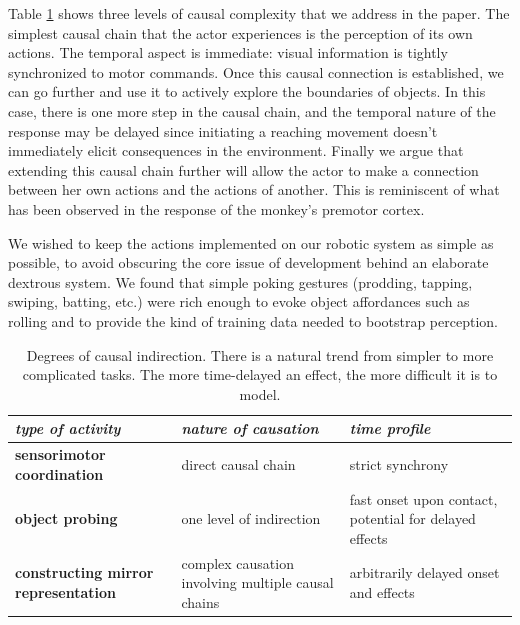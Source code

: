 Table \ref{tab:causation} shows three levels of causal complexity
that we address in the paper.
The simplest causal chain that the actor experiences is the
perception of its own actions.  The temporal aspect is immediate:
visual information is tightly synchronized to motor commands.
Once this causal connection is established, we can go further and use
it to actively explore the boundaries of objects.  In this case, there
is one more step in the causal chain, and the temporal nature of
the response may be delayed since initiating a reaching movement doesn't
immediately elicit consequences in the environment.  
Finally we argue that extending this causal chain further will allow
the actor to make a connection between her own actions and the actions 
of another. This is reminiscent of what has been observed in the response
of the monkey's premotor cortex. 

%
%
We wished to keep the actions implemented on our robotic system as
simple as possible, to avoid obscuring the core issue of development
behind an elaborate dextrous system.
%
%
%
%
We found that simple poking gestures
(prodding, tapping, swiping, batting, etc.) were rich enough 
to evoke object affordances such as rolling and to provide
the kind of training data needed to bootstrap perception.


\begin{table}[htbp]
\begin{center}
\begin{tabular}{|p{5.2cm}|p{4.5cm}|p{4.5cm}|}
\hline
{\it type of activity} & {\it nature of causation} &  {\it time profile} \\ \hline\hline
{\bf sensorimotor coordination} & direct causal chain & strict synchrony \\ \hline
{\bf object probing} & one level of indirection & fast onset upon contact, potential for delayed effects\\ \hline
{\bf constructing mirror representation} &  complex causation involving multiple causal chains & arbitrarily delayed onset and effects\\ \hline
\end{tabular}
\caption{
\label{tab:causation}
%
Degrees of causal indirection. There is a natural
trend from simpler to more complicated tasks.  The more time-delayed
an effect, the more difficult it is to model.
%
}
\end{center}
\end{table}


